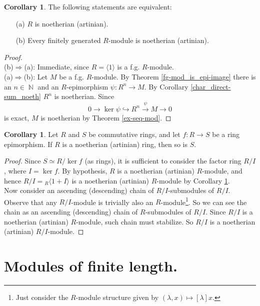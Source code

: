 \documentclass[12pt,a4paper]{report}
\theoremstyle{definition}
\newtheorem{corollary}[theorem]{Corollary} %
\theoremstyle{num.custom-title}
\DeclareMathOperator{\N}{\mathbb{N}}
\DeclareMathOperator{\imp}{\Rightarrow}
\begin{document}
\begin{corollary}\label{char_fg-subm_noeth}
The following statements are equivalent:
\begin{enumerate}
\item[(a)] $R$ is noetherian (artinian).
\item[(b)] Every finitely generated $R$-module is noetherian (artinian).
\end{enumerate}
\begin{proof}\ \\
(b)$\imp$(a): Immediate, since $R=\langle 1 \rangle$ is a f.g. $R$-module.
\\[6pt]
(a)$\imp$(b): Let $M$ be a f.g. $R$-module. By Theorem \ref{fg-mod_is_epi-image} there is an $n \in \N$ and an $R$-epimorphism $\psi: R^n \to M$. By Corollary \ref{char_direct-sum_noeth} $R^n$ is noetherian. Since
\[
0 \to \ker \psi \hookrightarrow R^n \stackrel{\psi}{\to} M \to 0
\]
is exact, $M$ is noetherian by Theorem \ref{ex-seq-mod}.
\end{proof}
\end{corollary}

\begin{corollary}
Let $R$ and $S$ be commutative rings, and let $f: R \to S$ be a ring epimorphism. If $R$ is a noetherian (artinian) ring, then so is $S$.
\begin{proof}
Since $S \simeq R/\ker f$ (as rings), it is sufficient to consider the factor ring $R/I$, where $I=\ker f$. By hypothesis, $R$ is a noetherian (artinian) $R$-module, and hence $R/I = {}_R \langle 1+I \rangle$ is a noetherian (artinian) $R$-module by Corollary \ref{char_fg-subm_noeth}.\\
Now consider an ascending (descending) chain of $R/I$-submodules of $R/I$. Observe that any $R/I$-module is trivially also an $R$-module\footnote{Just consider the $R$-module structure given by $(\lambda,x) \mapsto [\lambda]x$.}. So we can see the chain as an ascending (descending) chain of $R$-submodules of $R/I$. Since $R/I$ is a noetherian (artinian) $R$-module, such chain must stabilize. So $R/I$ is a noetherian (artinian) $R/I$-module.
\end{proof}
\end{corollary}

\section{Modules of finite length.	}
\end{document}
